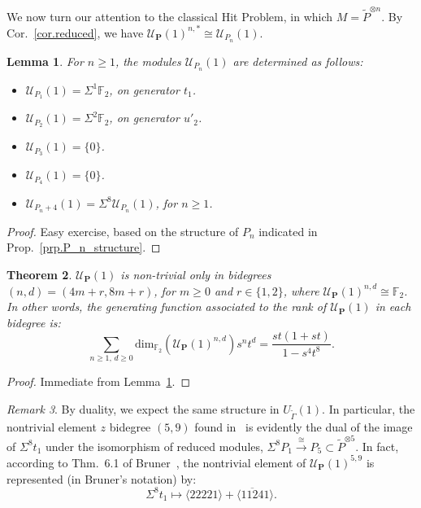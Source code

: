 \documentclass{amsart}
\newtheorem{theorem}{Theorem}
\theoremstyle{plain}
\newtheorem{lemma}[theorem]{Lemma}
\theoremstyle{definition}
\theoremstyle{remark}
\newtheorem{remark}[theorem]{Remark}
\begin{document}
We now turn our attention to the classical Hit Problem, in which $M =
\widetilde{P}^{\otimes n}$.  By Cor.~\ref{cor.reduced}, we have
$\mathcal{U}_{\mathbf{P}}(1)^{n,*} \cong \mathcal{U}_{P_n}(1)$.
\begin{lemma}\label{lem.hit_problem_P_n}
  For $n \geq 1$, the modules $\mathcal{U}_{P_n}(1)$ are determined as
  follows:
  \begin{itemize}
    \item $\mathcal{U}_{P_1}(1) = \Sigma^1 {\mathbb{F}}_2$, on generator $t_1$.
    \item $\mathcal{U}_{P_2}(1) = \Sigma^2 {\mathbb{F}}_2$, on generator $u'_2$.
    \item $\mathcal{U}_{P_3}(1) = \{0\}$.
    \item $\mathcal{U}_{P_4}(1) = \{0\}$.
    \item $\mathcal{U}_{P_n+4}(1) = \Sigma^8\mathcal{U}_{P_n}(1)$, for
      $n \geq 1$.
  \end{itemize}    
\end{lemma}
\begin{proof}
  Easy exercise, based on the structure of $P_n$ indicated in
  Prop.~\ref{prp.P_n_structure}.
\end{proof}
\begin{theorem}\label{thm.hit_problem_A(1)}
  $\mathcal{U}_{\mathbf{P}}(1)$ is non-trivial only in bidegrees $(n,
  d) = (4m+r, 8m+r)$, for $m \geq 0$ and $r \in \{1, 2\}$, where
  $\mathcal{U}_{\mathbf{P}}(1)^{n,d} \cong {\mathbb{F}}_2$.  In other words, the
  generating function associated to the rank of
  $\mathcal{U}_{\mathbf{P}}(1)$ in each bidegree is:
  \[
    \sum_{n \geq 1, \,d \geq 0} \mathrm{dim}_{{\mathbb{F}}_2}(
    \mathcal{U}_{\mathbf{P}}(1)^{n,d} )s^nt^d
    = \frac{st(1 + st)}{1-s^4t^8}.
  \]
\end{theorem}
\begin{proof}
  Immediate from Lemma~\ref{lem.hit_problem_P_n}.
\end{proof}
\begin{remark}
  By duality, we expect the same structure in
  $U_{\widetilde{\Gamma}}(1)$.  In particular, the nontrivial element
  $z$ bidegree $(5,9)$ found in~\cite{A2} is evidently the dual of the
  image of $\Sigma^8t_1$ under the isomorphism of reduced modules,
  $\Sigma^8P_1 \stackrel{\cong}{\to} P_5 \subset
  \widetilde{P}^{\otimes 5}$.  In fact, according to Thm.~6.1 of
  Bruner~\cite{Bruner}, the nontrivial element of
  $\mathcal{U}_{\mathbf{P}}(1)^{5,9}$ is represented (in Bruner's
  notation) by:
  \[
    \Sigma^8t_1 \mapsto \langle 22221 \rangle + \langle
    \overline{1124}1 \rangle.
  \]
\end{remark}
\end{document}
